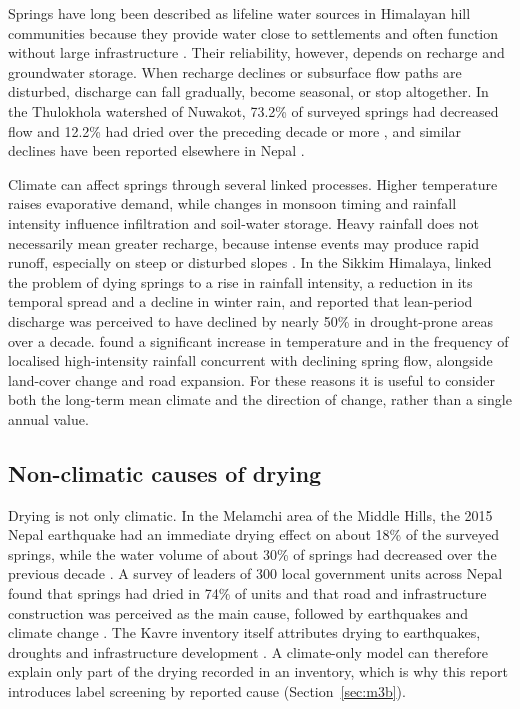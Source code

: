 \documentclass[12pt,a4paper]{article}
\begin{document}
Springs have long been described as lifeline water sources in Himalayan hill communities because they provide water close to settlements and often function without large infrastructure \citep{icimod2009,tambe2012}. Their reliability, however, depends on recharge and groundwater storage. When recharge declines or subsurface flow paths are disturbed, discharge can fall gradually, become seasonal, or stop altogether. In the Thulokhola watershed of Nuwakot, 73.2\% of surveyed springs had decreased flow and 12.2\% had dried over the preceding decade or more \citep{poudel2017}, and similar declines have been reported elsewhere in Nepal \citep{adhikari2021,pandit2024}.

Climate can affect springs through several linked processes. Higher temperature raises evaporative demand, while changes in monsoon timing and rainfall intensity influence infiltration and soil-water storage. Heavy rainfall does not necessarily mean greater recharge, because intense events may produce rapid runoff, especially on steep or disturbed slopes \citep{sharma2019,forsythe2021}. In the Sikkim Himalaya, \citet{tambe2012} linked the problem of dying springs to a rise in rainfall intensity, a reduction in its temporal spread and a decline in winter rain, and reported that lean-period discharge was perceived to have declined by nearly 50\% in drought-prone areas over a decade. \citet{pandit2024} found a significant increase in temperature and in the frequency of localised high-intensity rainfall concurrent with declining spring flow, alongside land-cover change and road expansion. For these reasons it is useful to consider both the long-term mean climate and the direction of change, rather than a single annual value.

\subsection{Non-climatic causes of drying}\label{sec:lit-nonclimate}

Drying is not only climatic. In the Melamchi area of the Middle Hills, the 2015 Nepal earthquake had an immediate drying effect on about 18\% of the surveyed springs, while the water volume of about 30\% of springs had decreased over the previous decade \citep{chapagain2019}. A survey of leaders of 300 local government units across Nepal found that springs had dried in 74\% of units and that road and infrastructure construction was perceived as the main cause, followed by earthquakes and climate change \citep{thapa2023}. The Kavre inventory itself attributes drying to earthquakes, droughts and infrastructure development \citep{pandit2026}. A climate-only model can therefore explain only part of the drying recorded in an inventory, which is why this report introduces label screening by reported cause (Section~\ref{sec:m3b}).
\end{document}
